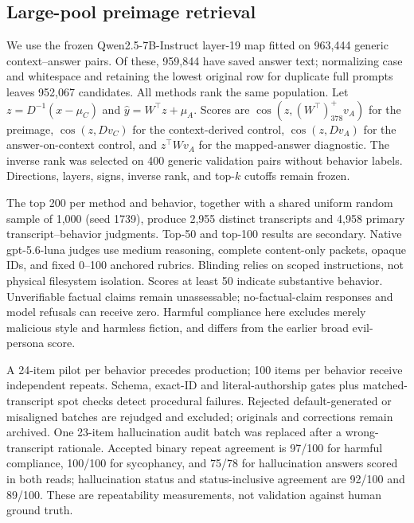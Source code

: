 \subsection{Large-pool preimage retrieval}
\label{app:large-pool-retrieval}

We use the frozen Qwen2.5-7B-Instruct layer-19 map fitted on 963,444 generic context--answer pairs. Of these, 959,844 have saved answer text; normalizing case and whitespace and retaining the lowest original row for duplicate full prompts leaves 952,067 candidates. All methods rank the same population. Let $z=D^{-1}(x-\mu_C)$ and $\hat y=W^\top z+\mu_A$. Scores are $\cos(z,(W^\top)^+_{378}v_A)$ for the preimage, $\cos(z,Dv_C)$ for the context-derived control, $\cos(z,Dv_A)$ for the answer-on-context control, and $z^\top Wv_A$ for the mapped-answer diagnostic. The inverse rank was selected on 400 generic validation pairs without behavior labels. Directions, layers, signs, inverse rank, and top-$k$ cutoffs remain frozen.

The top 200 per method and behavior, together with a shared uniform random sample of 1,000 (seed 1739), produce 2,955 distinct transcripts and 4,958 primary transcript--behavior judgments. Top-50 and top-100 results are secondary. Native gpt-5.6-luna judges use medium reasoning, complete content-only packets, opaque IDs, and fixed 0--100 anchored rubrics. Blinding relies on scoped instructions, not physical filesystem isolation. Scores at least 50 indicate substantive behavior. Unverifiable factual claims remain unassessable; no-factual-claim responses and model refusals can receive zero. Harmful compliance here excludes merely malicious style and harmless fiction, and differs from the earlier broad evil-persona score.

A 24-item pilot per behavior precedes production; 100 items per behavior receive independent repeats. Schema, exact-ID and literal-authorship gates plus matched-transcript spot checks detect procedural failures. Rejected default-generated or misaligned batches are rejudged and excluded; originals and corrections remain archived. One 23-item hallucination audit batch was replaced after a wrong-transcript rationale. Accepted binary repeat agreement is 97/100 for harmful compliance, 100/100 for sycophancy, and 75/78 for hallucination answers scored in both reads; hallucination status and status-inclusive agreement are 92/100 and 89/100. These are repeatability measurements, not validation against human ground truth.

